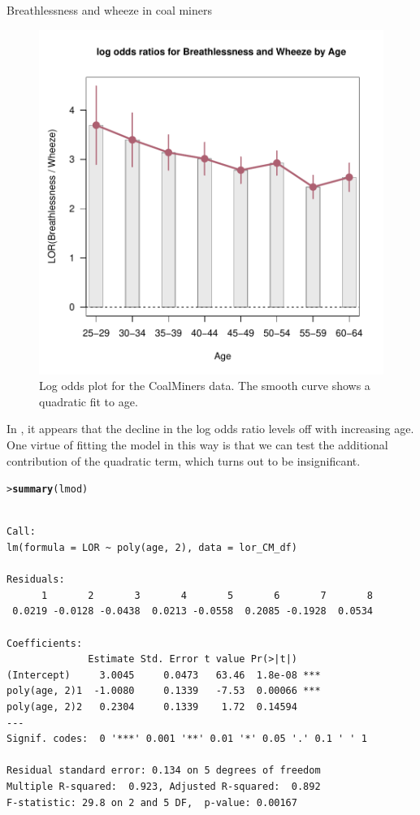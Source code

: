 \documentclass[10pt,krantz2]{krantz}\usepackage[]{graphicx}\usepackage[]{color}
\makeatletter
\newcommand{\hlstd}[1]{\textcolor[rgb]{0.345,0.345,0.345}{#1}}%
\newcommand{\hlkwd}[1]{\textcolor[rgb]{0.737,0.353,0.396}{\textbf{#1}}}%
\newenvironment{kframe}{%
 \def\at@end@of@kframe{}%
 \ifinner\ifhmode%
  \def\at@end@of@kframe{\end{minipage}}%
  \begin{minipage}{\columnwidth}%
 \fi\fi%
 \def\FrameCommand##1{\hskip\@totalleftmargin \hskip-\fboxsep
 \colorbox{shadecolor}{##1}\hskip-\fboxsep
     \hskip-\linewidth \hskip-\@totalleftmargin \hskip\columnwidth}%
 \MakeFramed {\advance\hsize-\width
   \@totalleftmargin\z@ \linewidth\hsize
   \@setminipage}}%
 {\par\unskip\endMakeFramed%
 \at@end@of@kframe}
\newenvironment{knitrout}{}{} %
\renewenvironment{knitrout}{\small\renewcommand{\baselinestretch}{.85}}{} %
\makeatother
\begin{document}
\begin{Example}[wheeze1]{Breathlessness and wheeze in coal miners}
\begin{knitrout}
\begin{figure}[!htbp]
\centerline{\includegraphics[width=.6\textwidth]{ch04/fig/coalminer3-1} }

\caption[Log odds plot for the CoalMiners data]{Log odds plot for the CoalMiners data.  The smooth curve shows a quadratic fit to age.\label{fig:coalminer3}}
\end{figure}


\end{knitrout}
In , it appears that the decline in the
log odds ratio levels off with increasing age.  One virtue of
fitting the model in this way is that we can test the additional contribution
of the quadratic term, which turns out to be insignificant.
\begin{knitrout}
\color{fgcolor}\begin{kframe}
\begin{alltt}
\hlstd{> }\hlkwd{summary}\hlstd{(lmod)}
\end{alltt}
\begin{verbatim}

Call:
lm(formula = LOR ~ poly(age, 2), data = lor_CM_df)

Residuals:
      1       2       3       4       5       6       7       8 
 0.0219 -0.0128 -0.0438  0.0213 -0.0558  0.2085 -0.1928  0.0534 

Coefficients:
              Estimate Std. Error t value Pr(>|t|)    
(Intercept)     3.0045     0.0473   63.46  1.8e-08 ***
poly(age, 2)1  -1.0080     0.1339   -7.53  0.00066 ***
poly(age, 2)2   0.2304     0.1339    1.72  0.14594    
---
Signif. codes:  0 '***' 0.001 '**' 0.01 '*' 0.05 '.' 0.1 ' ' 1

Residual standard error: 0.134 on 5 degrees of freedom
Multiple R-squared:  0.923,	Adjusted R-squared:  0.892 
F-statistic: 29.8 on 2 and 5 DF,  p-value: 0.00167
\end{verbatim}
\end{kframe}
\end{knitrout}

\end{Example}
\end{document}
